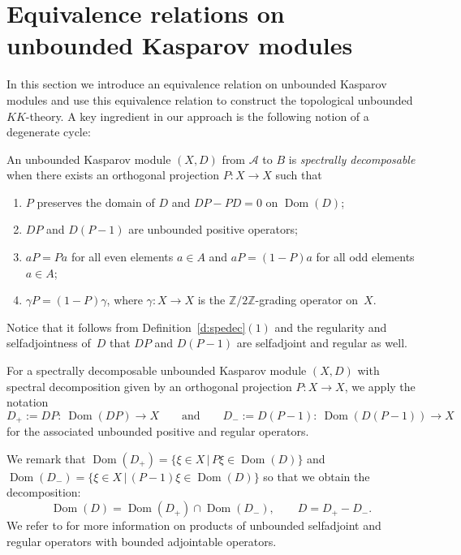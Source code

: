 \documentclass[11pt]{article}
\numberwithin{equation}{section}
\newcommand{\zz}{\mathbb{Z}}
\newcommand{\ga}{\gamma}
\newcommand{\s}[1]{\mathscr{#1}}
\begin{document}
\section{Equivalence relations on unbounded Kasparov modules}
In this section we introduce an equivalence relation on unbounded Kasparov modules and use this equivalence relation to construct the topological unbounded $KK$-theory. A key ingredient in our approach is the following notion of a degenerate cycle:

\begin{dfn}\label{d:spedec}
An unbounded Kasparov module $(X,D)$ from $\s A$ to $B$ is \emph{spectrally decomposable} when there exists an orthogonal projection $P \colon X \to X$ such that
\begin{enumerate}\itemsep=0pt
\item[1)] $P$ preserves the domain of $D$ and $D P - P D = 0$ on $\operatorname{Dom}(D)$;
\item[2)] $D P$ and $D (P - 1)$ are unbounded positive operators;
\item[3)] $a P = P a$ for all even elements $a \in A$ and $a P = (1 - P) a$ for all odd elements $a \in A$;
\item[4)] $\ga P = (1 - P) \ga$, where $\ga\colon X \to X$ is the $\zz/2\zz$-grading operator on~$X$.
\end{enumerate}
\end{dfn}

Notice that it follows from Definition~\ref{d:spedec}$(1)$ and the regularity and selfadjointness of~$D$ that $DP$ and $D(P-1)$ are selfadjoint and regular as well.

For a spectrally decomposable unbounded Kasparov module $(X,D)$ with spectral decomposition given by an orthogonal projection $P\colon X \to X$, we apply the notation
\[
D_+ := DP \colon \ \operatorname{Dom}(DP) \to X \qquad \text{and} \qquad D_- := D(P - 1)\colon \ \operatorname{Dom}(D(P-1)) \to X
\]
for the associated unbounded positive and regular operators. %

We remark that $\operatorname{Dom}(D_+) = \{ \xi \in X \,|\, P \xi \in \operatorname{Dom}(D) \}$ and $\operatorname{Dom}(D_-) = \{ \xi \in X \,|\, (P - 1) \xi \in \operatorname{Dom}(D) \}$ so that we obtain the decomposition:
\[
\operatorname{Dom}(D) = \operatorname{Dom}(D_+) \cap \operatorname{Dom}(D_-), \qquad D = D_+ - D_- .
\]
We refer to \cite[Section~6]{Kaa:DAH} for more information on products of unbounded selfadjoint and regular operators with bounded adjointable operators.
\end{document}
